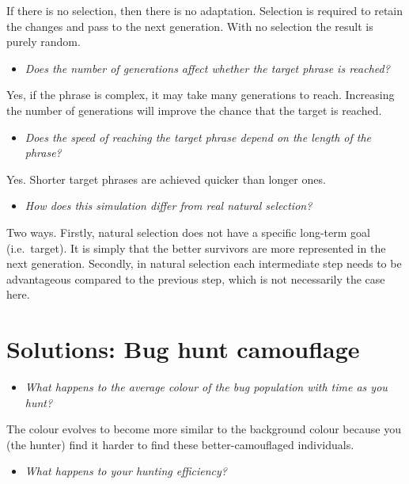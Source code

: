 \documentclass[
  a4paper]{book}
\providecommand{\tightlist}{%
  \setlength{\itemsep}{0pt}\setlength{\parskip}{0pt}}
\begin{document}
If there is no selection, then there is no adaptation. Selection is required to retain the changes and pass to the next generation. With no selection the result is purely random.

\begin{itemize}
\tightlist
\item
  \emph{Does the number of generations affect whether the target phrase is reached?}
\end{itemize}

Yes, if the phrase is complex, it may take many generations to reach. Increasing the number of generations will improve the chance that the target is reached.

\begin{itemize}
\tightlist
\item
  \emph{Does the speed of reaching the target phrase depend on the length of the phrase?}
\end{itemize}

Yes. Shorter target phrases are achieved quicker than longer ones.

\begin{itemize}
\tightlist
\item
  \emph{How does this simulation differ from real natural selection?}
\end{itemize}

Two ways. Firstly, natural selection does not have a specific long-term goal (i.e.~target). It is simply that the better survivors are more represented in the next generation. Secondly, in natural selection each intermediate step needs to be advantageous compared to the previous step, which is not necessarily the case here.

\section{Solutions: Bug hunt camouflage}\label{solutions-bug-hunt-camouflage}

\begin{itemize}
\tightlist
\item
  \emph{What happens to the average colour of the bug population with time as you hunt?}
\end{itemize}

The colour evolves to become more similar to the background colour because you (the hunter) find it harder to find these better-camouflaged individuals.

\begin{itemize}
\tightlist
\item
  \emph{What happens to your hunting efficiency?}
\end{itemize}
\end{document}
